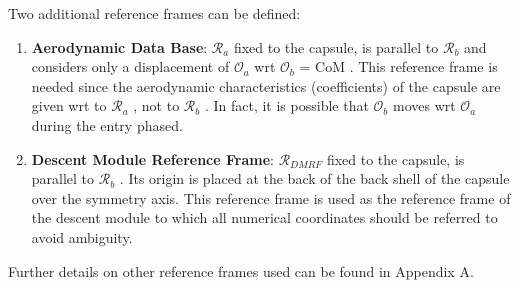    Two additional reference frames can be defined:

   \begin{enumerate}
      \item \textbf{Aerodynamic Data Base}: $\mathcal{R}_{a}$ fixed to the capsule, is parallel to $\mathcal{R}_b$ and considers
         only a displacement of $\mathcal{O}_a$ wrt $\mathcal{O}_b$ = CoM . This reference frame is needed since the aerodynamic
         characteristics (coefficients) of the capsule are given wrt to $\mathcal{R}_a$ , not to $\mathcal{R}_b$ . In fact, it is possible that
         $\mathcal{O}_b$ moves wrt $\mathcal{O}_a$ during the entry phased.
      \item \textbf{Descent Module Reference Frame}: $\mathcal{R}_{DMRF}$ fixed to the capsule, is
      parallel to $\mathcal{R}_b$ . Its origin is placed at the back of the back shell of the capsule over the symmetry
      axis. This reference frame is used as the reference frame of the descent module to which all
      numerical coordinates should be referred to avoid ambiguity.
   \end{enumerate}

Further details on other reference frames used can be found in Appendix A.